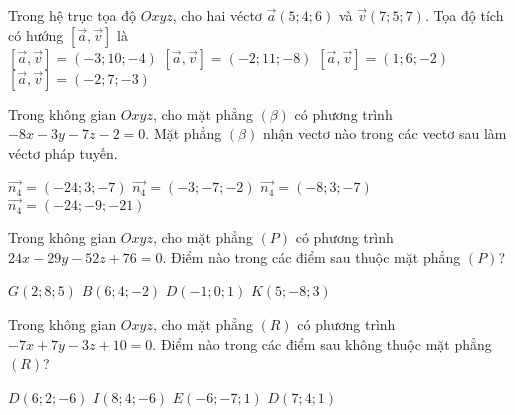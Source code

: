\documentclass[12pt,a4paper]{article}
\begin{document}
\begin{ex}
 Trong hệ trục tọa độ ${Oxyz}$, cho hai véctơ $\overrightarrow{a}(5;4;6)$ và $\overrightarrow{v}(7;5;7)$. Tọa độ tích có hướng $\left[\overrightarrow{a},\overrightarrow{v}\right]$ là\\ 
\choice
{ $\left[\overrightarrow{a},\overrightarrow{v}\right]=(-3;10;-4)$ }
   { $\left[\overrightarrow{a},\overrightarrow{v}\right]=(-2;11;-8)$ }
     { $\left[\overrightarrow{a},\overrightarrow{v}\right]=(1;6;-2)$ }
    { \True $\left[\overrightarrow{a},\overrightarrow{v}\right]= (-2;7;-3)$ }
\end{ex}

\begin{ex}
 Trong không gian ${Oxyz}$, cho mặt phẳng ${(\beta)}$ có phương trình $- 8 x - 3 y - 7 z - 2=0$. Mặt phẳng ${(\beta)}$ nhận vectơ nào trong các vectơ sau làm véctơ pháp tuyến.
 
\choice
{ $\overrightarrow{n_4}=(-24;3;-7)$ }
   { $\overrightarrow{n_4}=(-3;-7;-2)$ }
     { $\overrightarrow{n_4}=(-8;3;-7)$ }
    { \True $\overrightarrow{n_4}=(-24;-9;-21)$ }
\end{ex}

\begin{ex}
 Trong không gian ${Oxyz}$, cho mặt phẳng ${(P)}$ có phương trình $24 x - 29 y - 52 z + 76=0$. Điểm nào trong các điểm sau thuộc mặt phẳng ${(P)}$?
 
\choice
{ $G(2;8;5)$ }
   { $B(6;4;-2)$ }
     { \True $D(-1;0;1)$ }
    { $K(5;-8;3)$ }
\end{ex}

\begin{ex}
 Trong không gian ${Oxyz}$, cho mặt phẳng ${(R)}$ có phương trình $- 7 x + 7 y - 3 z + 10=0$. Điểm nào trong các điểm sau không thuộc mặt phẳng ${(R)}$?
 
\choice
{ $D(6;2;-6)$ }
   { $I(8;4;-6)$ }
     { $E(-6;-7;1)$ }
    { \True $D(7;4;1)$ }
\end{ex}
\end{document}
